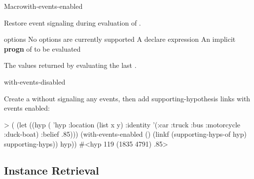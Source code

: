 \documentclass[10pt,twoside,english,pdftex]{article}
\begin{document}
\begin{functiondoc}{Macro}{with-events-enabled}%
  {\code{(}\superstar{}\code{)}
    \superstar{}
    \superstar{}
    \returns{} \superstar}
%
%
  
\fnsyntax

\fnpurpose Restore event signaling during evaluation of .

\fnpackage {}

\fnmodule {}

\fnargs
\begin{args}{options}
\arg[option] No options are currently supported
\arg[declaration] A declare expression
\arg[forms] An implicit \textbf{progn} of  to be evaluated
\end{args}

\fnreturns The values returned by evaluating the last .

\begin{alsos}{with-events-disabled}
\end{alsos}

\fnexample
{}%
Create a  without signaling any events, then add
supporting-hypothesis links with events enabled:
\begin{example}
> (
     (let ((hyp ( 'hyp 
                    :location (list x y)
                    :identity '(:car :truck :bus :motorcycle :duck-boat)
                    :belief .85)))
        (with-events-enabled ()
           (linkf (supporting-hyps-of hyp) supporting-hyps))
        hyp))
#<hyp 119 (1835 4791) .85>
\end{example}

\end{functiondoc}


\T\markright{}%
\T\pagestyle{plain}
\T\clearpage
\W{}
\T\pagestyle{fancy}
\T\thispagestyle{fancybottom}
\T\global\def\fnlastname{ }%

\subsection{Instance Retrieval}
\label{sec:retrieval}%
\end{document}
